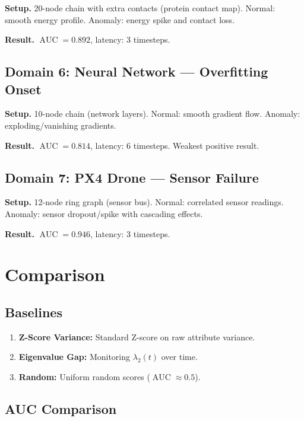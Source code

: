 \documentclass[11pt,a4paper]{article}
\DeclareMathOperator{\AUC}{AUC}
\begin{document}
\textbf{Setup.} 20-node chain with extra contacts (protein contact map).
Normal: smooth energy profile.  Anomaly: energy spike and contact loss.

\textbf{Result.} $\AUC = 0.892$, latency: 3 timesteps.

\subsection{Domain 6: Neural Network --- Overfitting Onset}

\textbf{Setup.} 10-node chain (network layers).  Normal: smooth gradient flow.
Anomaly: exploding/vanishing gradients.

\textbf{Result.} $\AUC = 0.814$, latency: 6 timesteps.  Weakest positive result.

\subsection{Domain 7: PX4 Drone --- Sensor Failure}

\textbf{Setup.} 12-node ring graph (sensor bus).  Normal: correlated sensor
readings.  Anomaly: sensor dropout/spike with cascading effects.

\textbf{Result.} $\AUC = 0.946$, latency: 3 timesteps.

\section{Comparison}
\label{sec:comparison}

\subsection{Baselines}

\begin{enumerate}
  \item \textbf{Z-Score Variance:} Standard Z-score on raw attribute variance.
  \item \textbf{Eigenvalue Gap:} Monitoring $\lambda_2(t)$ over time.
  \item \textbf{Random:} Uniform random scores ($\AUC \approx 0.5$).
\end{enumerate}

\subsection{AUC Comparison}
\end{document}
